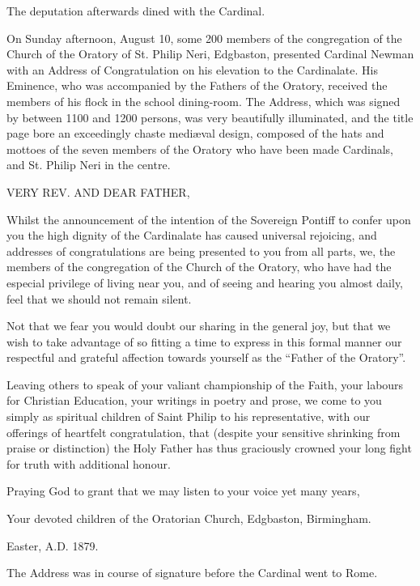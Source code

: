 The deputation afterwards dined with the Cardinal.


On Sunday afternoon, August 10, some 200 members of the
congregation of the Church of the Oratory of St. Philip Neri,
Edgbaston, presented Cardinal Newman with an Address of Congratulation
on his elevation to the Cardinalate. His Eminence, who was accompanied
by the Fathers of the Oratory, received the
members of his flock in the school dining-room. The Address, which was
signed by between 1100 and 1200 persons, was very beautifully
illuminated, and the title page bore an exceedingly chaste mediæval
design, composed of the hats and mottoes of the seven members of the
Oratory who have been made Cardinals, and St. Philip Neri in the
centre.

VERY REV. AND
DEAR FATHER,

Whilst the announcement of the intention of the Sovereign Pontiff to
confer upon you the high dignity of the Cardinalate has caused
universal rejoicing, and addresses of congratulations are being
presented to you from all parts, we, the members of the congregation
of the Church of the Oratory, who have had the especial privilege of
living near you, and of seeing and hearing you almost daily, feel that
we should not remain silent.

Not that we fear you would doubt our sharing in the general joy,
but that we wish to take advantage of so fitting a time to express in
this formal manner our respectful and grateful affection towards
yourself as the ``Father of the Oratory''.

Leaving others to speak of your valiant championship of the Faith,
your labours for Christian Education, your writings in poetry and
prose, we come to you simply as spiritual children of Saint Philip to
his representative, with our offerings of heartfelt congratulation,
that (despite your sensitive shrinking from praise or distinction)
the Holy Father has thus graciously crowned your long fight for
truth with additional honour.

Praying God to grant that we may listen to your voice yet many
years,

Your devoted children of the Oratorian Church, Edgbaston, Birmingham.

Easter, A.D. 1879.

The Address was in course of signature before the Cardinal went to
Rome.



